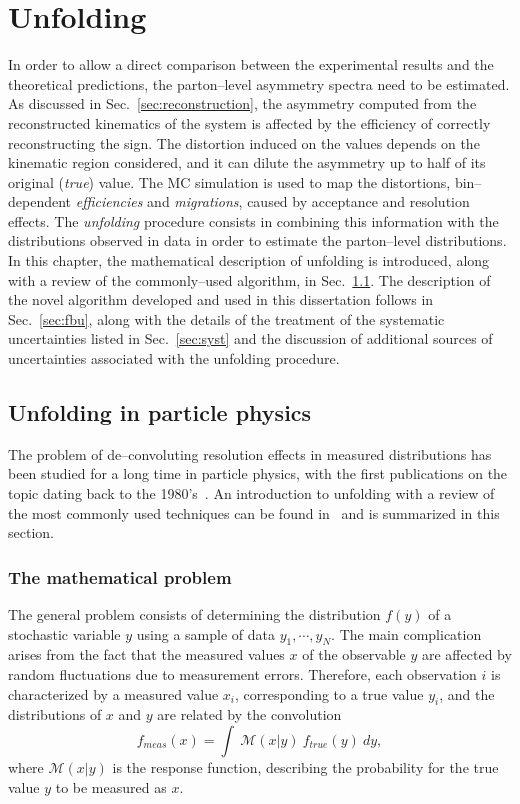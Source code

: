 \chapter{Unfolding}
\label{sec:unfolding}

In order to allow a direct comparison between the experimental results
and the theoretical predictions, the parton--level asymmetry spectra need
to be estimated.
As discussed in Sec.~\ref{sec:reconstruction}, the asymmetry computed
from the reconstructed kinematics of the \ttbar{} system is affected
by the efficiency of correctly reconstructing the \dy{} sign. The
distortion induced on the \ac{} values depends on the kinematic region
considered, and it can dilute the asymmetry up to half of its original
({\it true}) value.
The \ttbar{} MC simulation is used to map the distortions,
bin--dependent {\it efficiencies} and {\it migrations}, caused by
acceptance and resolution effects. The {\it unfolding} procedure
consists in combining this information with the distributions observed
in data in order to estimate the parton--level distributions.
In this chapter, the mathematical description of unfolding
is introduced, along with a review of the commonly--used algorithm, in
Sec.~\ref{sec:unfoverview}.
The description of the novel algorithm developed and used in this
dissertation follows in Sec.~\ref{sec:fbu}, along with the details
of the treatment of the systematic uncertainties listed in
Sec.~\ref{sec:syst} and the discussion of additional sources of
uncertainties associated with the unfolding procedure.

\section{Unfolding in particle physics}
\label{sec:unfoverview}

The problem of de--convoluting resolution effects in measured
distributions has been studied for a long time in particle physics,
with the first publications on the topic dating back to the
1980's~\cite{Blobel:157405}. An introduction to unfolding with a
review of the most commonly used techniques can be found
in~\cite{Cowan:2002in} and is summarized in this section. 

\subsection{The mathematical problem}

The general problem consists of determining the distribution $f(y)$ of a
stochastic variable $y$ using a sample of data $y_1,\cdots{},y_N$.
The main complication arises from the fact that the measured values
$x$ of the observable $y$ are affected by random fluctuations due to
measurement errors. Therefore, each observation $i$ is characterized
by a measured value $x_i$, corresponding to a true value $y_i$, and the
distributions of $x$ and $y$ are related by the convolution
\begin{equation}
\label{eq:convolution}
f_{meas}(x) = \int~\mathcal{M}(x|y)~f_{true}(y)~dy,
\end{equation}
where $\mathcal{M}(x|y)$ is the response function, describing the
probability for the true value $y$ to be measured as $x$.

